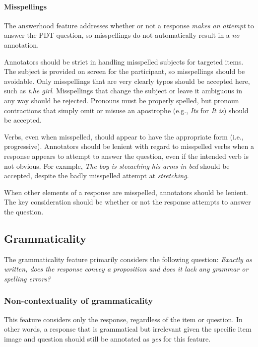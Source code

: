 \documentclass[12pt]{article}
\begin{document}
\paragraph{Misspellings}
\label{para:answerhood-misspellings}
The answerhood feature addresses whether or not a response \textit{makes an attempt} to answer the PDT question, so misspellings do not automatically result in a \textit{no} annotation. 

Annotators should be strict in handling misspelled subjects for targeted items. The subject is provided on screen for the participant, so misspellings should be avoidable. Only misspellings that are very clearly typos should be accepted here, such as \textit{t.he girl}. Misspellings that change the subject or leave it ambiguous in any way should be rejected. Pronouns must be properly spelled, but pronoun contractions that simply omit or misuse an apostrophe (e.g., \textit{Its} for \textit{It is}) should be accepted.

Verbs, even when misspelled, should appear to have the appropriate form (i.e., progressive). Annotators should be lenient with regard to misspelled verbs when a response appears to attempt to answer the question, even if the intended verb is not obvious. For example, \textit{The boy is steeaching his arms in bed} should be accepted, despite the badly misspelled attempt at \textit{stretching}.

When other elements of a response are misspelled, annotators should be lenient. The key consideration should be whether or not the response attempts to answer the question.

\subsection{Grammaticality} \label{subsec:grammaticality}
The grammaticality feature primarily considers the following question: \textit{Exactly as written, does the response convey a proposition and does it lack any grammar or spelling errors?}

\subsubsection{Non-contextuality of grammaticality} This feature considers only the response, regardless of the item or question. In other words, a response that is grammatical but  irrelevant given the specific item image and question should still be annotated as \textit{yes} for this feature.
\end{document}
